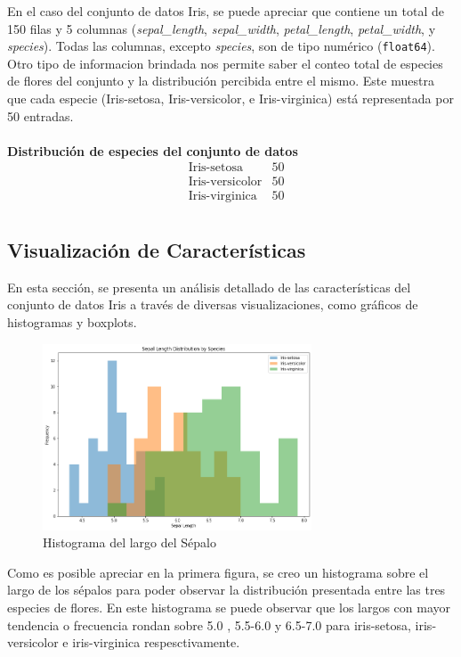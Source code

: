 \documentclass[conference]{IEEEtran}
\begin{document}
En el caso del conjunto de datos Iris, se puede apreciar que contiene un total de 150 filas y 5 columnas (\textit{sepal\_length}, \textit{sepal\_width}, \textit{petal\_length}, \textit{petal\_width}, y \textit{species}). Todas las columnas, excepto \textit{species}, son de tipo numérico (\texttt{float64}).
\\
Otro tipo de informacion brindada nos permite saber el conteo total de especies de flores del conjunto y la distribución percibida entre el mismo. Este muestra que cada especie (Iris-setosa, Iris-versicolor, e Iris-virginica) está representada por 50 entradas.\\\\

\textbf{Distribución de especies del conjunto de datos}
\begin{align*}
&\text{Iris-setosa} & 50 \\
&\text{Iris-versicolor} & 50 \\
&\text{Iris-virginica} & 50 \\
\end{align*}

\subsection{Visualización de Características}
En esta sección, se presenta un análisis detallado de las características del conjunto de datos Iris a través de diversas visualizaciones, como gráficos de  histogramas y boxplots.

\begin{figure}[ht]
  \includegraphics[width=80mm]{images/sepal_length.png}
  \caption{Histograma del largo del Sépalo}\label{fig1}
\end{figure}
\FloatBarrier

Como es posible apreciar en la primera figura, se creo un histograma sobre el largo de los sépalos para poder observar la distribución presentada entre las tres especies de flores. En este histograma se puede observar que los largos con mayor tendencia o frecuencia rondan sobre 5.0 , 5.5-6.0 y 6.5-7.0 para iris-setosa, iris-versicolor e iris-virginica respesctivamente.
\end{document}
